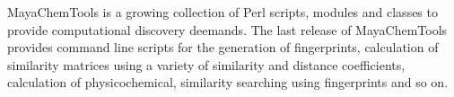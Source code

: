 MayaChemTools is a growing collection of Perl scripts, modules and classes to provide computational discovery deemands. The last release of MayaChemTools provides command line scripts for the generation of fingerprints, calculation of similarity matrices using a variety of similarity and distance coefficients, calculation of physicochemical, similarity searching using fingerprints and so on.